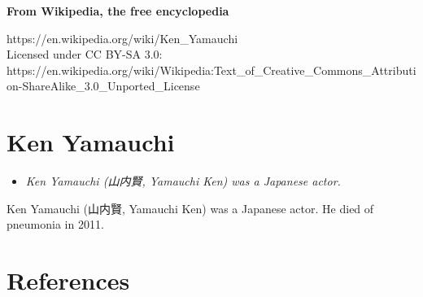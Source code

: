 \textbf{From Wikipedia, the free encyclopedia}

https://en.wikipedia.org/wiki/Ken\_Yamauchi\\
Licensed under CC BY-SA 3.0:\\
https://en.wikipedia.org/wiki/Wikipedia:Text\_of\_Creative\_Commons\_Attribution-ShareAlike\_3.0\_Unported\_License

\section{Ken Yamauchi}\label{ken-yamauchi}

\begin{itemize}
\item
  \emph{Ken Yamauchi (山内賢, Yamauchi Ken) was a Japanese actor.}
\end{itemize}

Ken Yamauchi (山内賢, Yamauchi Ken) was a Japanese actor. He died of
pneumonia in 2011.

\section{References}\label{references}
